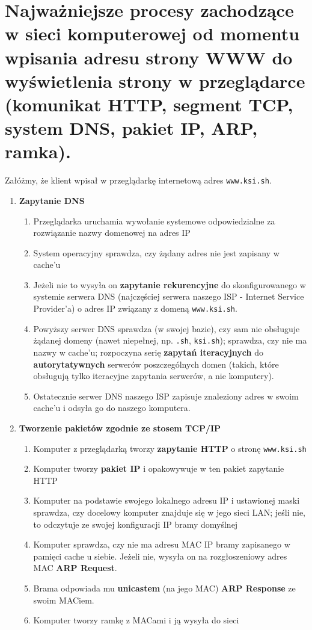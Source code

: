 \documentclass[main.tex]{subfiles}
\begin{document}
    \section{Najważniejsze procesy zachodzące w sieci komputerowej od momentu wpisania adresu strony WWW do wyświetlenia strony w przeglądarce (komunikat HTTP, segment TCP, system DNS, pakiet IP, ARP, ramka).}
    Załóżmy, że klient wpisał w przeglądarkę internetową adres \texttt{www.ksi.sh}.
    \begin{enumerate}
        \item \textbf{Zapytanie DNS}
        \begin{enumerate}[noitemsep]
            \item Przeglądarka uruchamia wywołanie systemowe odpowiedzialne za rozwiązanie nazwy domenowej na adres IP
            \item System operacyjny sprawdza, czy żądany adres nie jest zapisany w cache'u
            \item Jeżeli nie to wysyła on \textbf{zapytanie rekurencyjne} do skonfigurowanego w systemie serwera DNS
            (najczęściej serwera naszego ISP - Internet Service Provider'a) o adres IP związany z domeną \texttt{www.ksi.sh}.
            \item Powyższy serwer DNS sprawdza (w swojej bazie), czy sam nie obsługuje żądanej domeny (nawet niepełnej, np.
            \texttt{.sh}, \texttt{ksi.sh}); sprawdza, czy nie ma nazwy w cache'u; rozpoczyna serię \textbf{zapytań
            iteracyjnych} do \textbf{autorytatywnych} serwerów
            poszczególnych domen (takich, które obsługują tylko iteracyjne zapytania serwerów, a nie komputery).
            \item Ostatecznie serwer DNS naszego ISP zapisuje znaleziony adres w swoim cache'u i odsyła go do naszego
            komputera.
        \end{enumerate}

        \item \textbf{Tworzenie pakietów zgodnie ze stosem TCP/IP}
        \begin{enumerate}[noitemsep]
            \item Komputer z przeglądarką tworzy \textbf{zapytanie HTTP} o stronę \texttt{www.ksi.sh}
            \item Komputer tworzy \textbf{pakiet IP} i opakowywuje w ten pakiet zapytanie HTTP
            \item Komputer na podstawie swojego lokalnego adresu IP i ustawionej maski sprawdza, czy docelowy komputer
            znajduje się w jego sieci LAN; jeśli nie, to odczytuje ze swojej konfiguracji IP bramy domyślnej
            \item Komputer sprawdza, czy nie ma adresu MAC IP bramy zapisanego w pamięci cache u siebie.
            Jeżeli nie, wysyła on na rozgłoszeniowy adres MAC \textbf{ARP Request}.
            \item Brama odpowiada mu \textbf{unicastem} (na jego MAC) \textbf{ARP Response} ze swoim MACiem.
            \item Komputer tworzy ramkę z MACami i ją wysyła do sieci
        \end{enumerate}


\end{enumerate}
\end{document}
